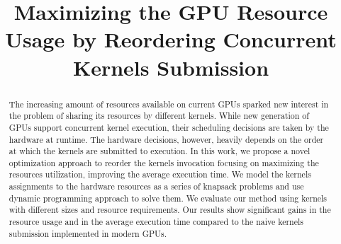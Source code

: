 \documentclass[conference]{IEEEtran}
\begin{document}
%
\title{Maximizing the GPU Resource Usage by Reordering Concurrent Kernels Submission}




% 
\author{
}








\maketitle

\begin{abstract}
The increasing amount of resources available on current GPUs sparked new interest in the problem of sharing its resources by different kernels. While new generation of GPUs support concurrent kernel execution, their scheduling decisions are taken by the hardware at runtime. The hardware decisions, however, heavily depends on the order
at which the kernels are submitted to execution. In this work, we propose a novel optimization approach to reorder the kernels invocation focusing on maximizing the resources utilization, improving the average execution time. We model the kernels assignments to the hardware resources as a series of knapsack problems and use dynamic programming approach to solve them. We evaluate our method using kernels with different sizes and resource requirements. Our results show significant gains in the resource usage and in the average execution time compared to the naive kernels submission implemented in modern GPUs.
\end{abstract}
\end{document}
